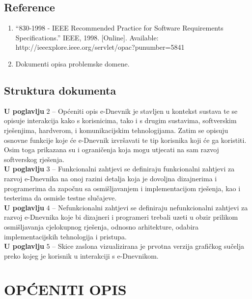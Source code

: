 \documentclass{scrreprt}
\begin{document}
\section{Reference}
\begin{enumerate}
    \item “830-1998 - IEEE Recommended Practice for Software Requirements Specifications.” IEEE, 1998. [Online]. Available: http://ieeexplore.ieee.org/servlet/opac?punumber=5841
    \item Dokumenti opisa problemske domene.
\end{enumerate}

\section{Struktura dokumenta}
\textbf{U poglavlju} $2$ – Općeniti opis e-Dnevnik je stavljen u kontekst sustava te se opisuje interakcija kako s korisnicima, tako i s drugim sustavima, softverskim rješenjima, hardverom, i komunikacijskim tehnologijama. Zatim se opisuju osnovne funkcije koje će e-Dnevnik izvršavati te tip korisnika koji će ga koristiti. Osim toga prikazana su i ograničenja koja mogu utjecati na sam razvoj softverskog rješenja.\\
\textbf{U poglavlju} $3$ – Funkcionalni zahtjevi se definiraju funkcionalni zahtjevi za razvoj e-Dnevnika na onoj razini detalja koja je dovoljna dizajnerima i programerima da započnu sa osmišljavanjem i implementacijom rješenja, kao i testerima da osmisle testne slučajeve.\\
\textbf{U poglavlju} $4$ – Nefunkcionalni zahtjevi se definiraju nefunkcionalni zahtjevi za razvoj e-Dnevnika koje bi dizajneri i programeri trebali uzeti u obzir prilikom osmišljavanja cjelokupnog rješenja, odnosno arhitekture, odabira implementacijskih tehnologija i pristupa.\\
\textbf{U poglavlju} $5$ – Skice zaslona vizualizirana je prvotna verzija grafičkog sučelja preko kojeg je korisnik u interakciji s e-Dnevnikom.

\chapter{OPĆENITI OPIS}
\end{document}
